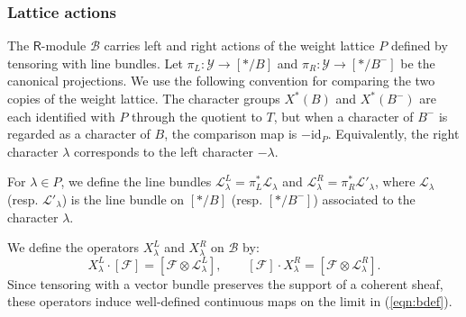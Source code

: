 \documentclass{amsart}
\newcommand{\Ring}{\mathsf{R}}
\theoremstyle{definition}
\numberwithin{equation}{section}
\begin{document}
\subsubsection{Lattice actions}\label{SSS_lattice_actions}
The $\Ring$-module $\mathcal{B}$ carries left and right actions of the weight lattice $P$ defined by tensoring with line bundles. Let $\pi_L: \mathcal{Y} \to [*/B]$ and $\pi_R: \mathcal{Y} \to [*/B^-]$ be the canonical projections. We use the following convention for comparing the two copies of the weight lattice. The character groups $X^*(B)$ and $X^*(B^-)$ are each identified with $P$ through the quotient to $T$, but when a character of $B^-$ is regarded as a character of $B$, the comparison map is $-\mathrm{id}_P$. Equivalently, the right character $\lambda$ corresponds to the left character $-\lambda$.

For $\lambda \in P$, we define the line bundles $\mathcal{L}_\lambda^L = \pi_L^* \mathcal{L}_\lambda$ and $\mathcal{L}_\lambda^R = \pi_R^* \mathcal{L}'_\lambda$, where $\mathcal{L}_\lambda$ (resp. $\mathcal{L}'_\lambda$) is the line bundle on $[*/B]$ (resp. $[*/B^-]$) associated to the character $\lambda$.

We define the operators $X_\lambda^L$ and $X_\lambda^R$ on $\mathcal{B}$ by:
\[
X_\lambda^L \cdot [\mathcal{F}] = [\mathcal{F} \otimes \mathcal{L}_{\lambda}^L], \quad \quad [\mathcal{F}] \cdot X_\lambda^R = [\mathcal{F} \otimes \mathcal{L}_{\lambda}^R].
\]
Since tensoring with a vector bundle preserves the support of a coherent sheaf, these operators induce well-defined continuous maps on the limit in (\ref{eqn:bdef}).
\end{document}
